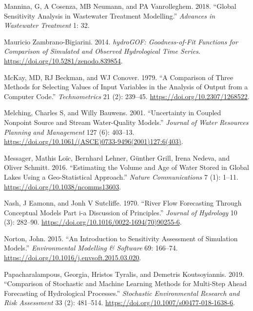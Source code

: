 \begin{CSLReferences}{1}{0}
\leavevmode{}%
Mannina, G, A Cosenza, MB Neumann, and PA Vanrolleghem. 2018. {``Global Sensitivity Analysis in Wastewater Treatment Modelling.''} \emph{Advances in Wastewater Treatment} 1: 32.

\leavevmode{}%
Mauricio Zambrano-Bigiarini. 2014. \emph{hydroGOF: Goodness-of-Fit Functions for Comparison of Simulated and Observed Hydrological Time Series}. \url{https://doi.org/10.5281/zenodo.839854}.

\leavevmode{}%
McKay, MD, RJ Beckman, and WJ Conover. 1979. {``A Comparison of Three Methods for Selecting Values of Input Variables in the Analysis of Output from a Computer Code.''} \emph{Technometrics} 21 (2): 239--45. \url{https://doi.org/10.2307/1268522}.

\leavevmode{}%
Melching, Charles S, and Willy Bauwens. 2001. {``Uncertainty in Coupled Nonpoint Source and Stream Water-Quality Models.''} \emph{Journal of Water Resources Planning and Management} 127 (6): 403--13. \url{https://doi.org/10.1061/(ASCE)0733-9496(2001)127:6(403)}.

\leavevmode{}%
Messager, Mathis Loïc, Bernhard Lehner, Günther Grill, Irena Nedeva, and Oliver Schmitt. 2016. {``Estimating the Volume and Age of Water Stored in Global Lakes Using a Geo-Statistical Approach.''} \emph{Nature Communications} 7 (1): 1--11. \url{https://doi.org/10.1038/ncomms13603}.

\leavevmode{}%
Nash, J Eamonn, and Jonh V Sutcliffe. 1970. {``River Flow Forecasting Through Conceptual Models Part i-a Discussion of Principles.''} \emph{Journal of Hydrology} 10 (3): 282--90. \url{https://doi.org/10.1016/0022-1694(70)90255-6}.

\leavevmode{}%
Norton, John. 2015. {``An Introduction to Sensitivity Assessment of Simulation Models.''} \emph{Environmental Modelling \& Software} 69: 166--74. \url{https://doi.org/10.1016/j.envsoft.2015.03.020}.

\leavevmode{}%
Papacharalampous, Georgia, Hristos Tyralis, and Demetris Koutsoyiannis. 2019. {``Comparison of Stochastic and Machine Learning Methods for Multi-Step Ahead Forecasting of Hydrological Processes.''} \emph{Stochastic Environmental Research and Risk Assessment} 33 (2): 481--514. \url{https://doi.org/10.1007/s00477-018-1638-6}.


\end{CSLReferences}
